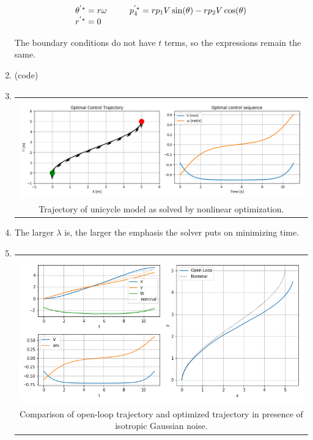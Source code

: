 \documentclass{article}
\begin{document}
\begin{enumerate}[label=(\roman*)]
\begin{equation}
{\begin{tabular}[c]{l l l l l}
	$\theta^{'*} = r\omega$ &\;&
	$p_4^{'*} = rp_1V\sin(\theta) - rp_2V\cos(\theta)$ \\
	
	$r^{'*} = 0$
	\end{tabular}}
	\end{equation}
	
	The boundary conditions do not have $t$ terms, so the expressions remain the same.
	
	\item %
	(code)
	
	\item %
	\begin{tabular}[t]{c}
		\hline \\
		\includegraphics[width=1.0\textwidth]{img/optimal_control.png} \\
		Trajectory of unicycle model as solved by nonlinear optimization.\\
		\hline
	\end{tabular}
	
	\item %
	The larger $\lambda$ is, the larger the emphasis the solver puts on minimizing time.

	\pagebreak

	\item %
	\begin{tabular}[t]{c}
		\hline \\
		\includegraphics[width=1.0\textwidth]{img/sim_traj_optimal_control.png} \\
		Comparison of open-loop trajectory and optimized trajectory in presence of isotropic Gaussian noise. \\
		\hline
	\end{tabular}
	
	
	\end{enumerate}
\end{document}
